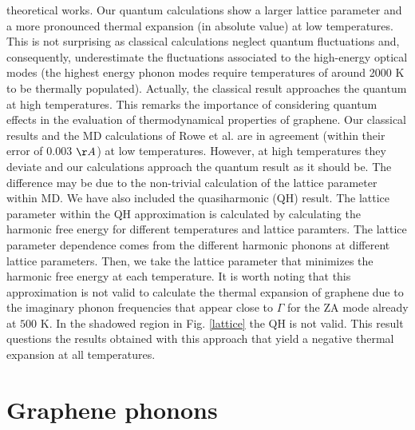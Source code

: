 theoretical works\cite{rowe2018development,zakharchenko2009finite}. Our quantum calculations show a larger lattice 
parameter and a more pronounced thermal expansion (in absolute value) at low temperatures. This is not surprising as 
classical calculations neglect quantum fluctuations and, consequently, underestimate the fluctuations associated to 
the high-energy optical modes (the highest energy phonon modes require temperatures of around 2000 K to be thermally 
populated). Actually, the classical result approaches the quantum at high temperatures. This remarks the importance 
of considering quantum effects in the evaluation of thermodynamical properties of graphene. Our classical results 
and the MD calculations of Rowe et al.\cite{rowe2018development} are in agreement (within their error of $0.003$ 
$\AA$) at low temperatures. However, at high temperatures they deviate and our calculations approach the quantum 
result as it should be. The difference may be due to the non-trivial calculation of the lattice parameter within MD. 
We have also included the quasiharmonic (QH) result. The lattice parameter within the QH approximation is calculated 
by calculating the harmonic free energy for different temperatures and lattice paramters. The lattice parameter 
dependence comes from the different harmonic phonons at different lattice parameters. Then, we take the lattice 
parameter that minimizes the harmonic free energy at each temperature. It is worth noting that this approximation is 
not valid to calculate the thermal expansion of graphene due to the imaginary phonon frequencies that appear close 
to $\Gamma$ for the ZA mode already at $500$ K. In the shadowed region in Fig. \ref{lattice} the QH is not 
valid. This result questions the results obtained with this approach that yield a negative thermal expansion at all 
temperatures\cite{mounet2005first}.

\section{Graphene phonons}

